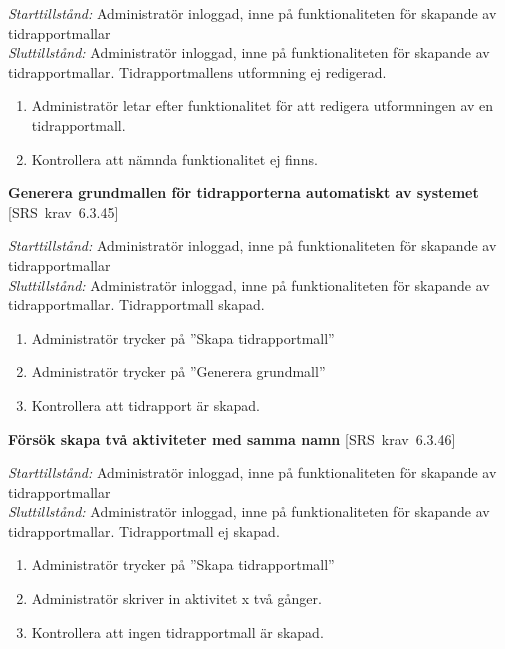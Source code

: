 \documentclass[a4paper]{article}
\def\reqinside{\hfil\penalty 100 \hfilneg \hbox}
\def \req [#1]{\reqinside{[SRS krav #1]}}
\begin{document}
\begin{FT}
\emph{Starttillstånd:} Administratör inloggad, inne på funktionaliteten för skapande av tidrapportmallar\\
\emph{Sluttillstånd:} Administratör inloggad, inne på funktionaliteten för skapande av tidrapportmallar. Tidrapportmallens utformning ej redigerad.\\

\begin{enumerate}
\item Administratör letar efter funktionalitet för att redigera utformningen av en tidrapportmall.
\item Kontrollera att nämnda funktionalitet ej finns.
\end{enumerate}



\item
\textbf{Generera grundmallen för tidrapporterna automatiskt av systemet} \req[6.3.45]

\emph{Starttillstånd:} Administratör inloggad, inne på funktionaliteten för skapande av tidrapportmallar\\
\emph{Sluttillstånd:} Administratör inloggad, inne på funktionaliteten för skapande av tidrapportmallar. Tidrapportmall skapad.\\

\begin{enumerate}
\item Administratör trycker på ''Skapa tidrapportmall''
\item Administratör trycker på ''Generera grundmall''
\item Kontrollera att tidrapport är skapad.
\end{enumerate}


\item
\textbf{Försök skapa två aktiviteter med samma namn} \req[6.3.46]

\emph{Starttillstånd:} Administratör inloggad, inne på funktionaliteten för skapande av tidrapportmallar\\
\emph{Sluttillstånd:} Administratör inloggad, inne på funktionaliteten för skapande av tidrapportmallar. Tidrapportmall ej skapad.\\

\begin{enumerate}
\item Administratör trycker på ''Skapa tidrapportmall''
\item Administratör skriver in aktivitet x två gånger.
\item Kontrollera att ingen tidrapportmall är skapad.
\end{enumerate}



\end{FT}
\end{document}
